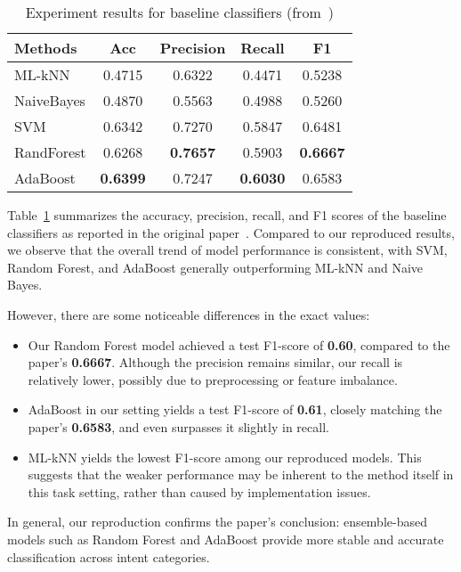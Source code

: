 \documentclass{article}
\begin{document}
\begin{table}[htbp]
\centering
\caption{Experiment results for baseline classifiers (from~\cite{qu2019user})}
\label{tab:baseline-results}
\begin{tabular}{lcccc}
\toprule
\textbf{Methods} & \textbf{Acc} & \textbf{Precision} & \textbf{Recall} & \textbf{F1} \\
\midrule
ML-kNN     & 0.4715 & 0.6322 & 0.4471 & 0.5238 \\
NaiveBayes & 0.4870 & 0.5563 & 0.4988 & 0.5260 \\
SVM        & 0.6342 & 0.7270 & 0.5847 & 0.6481 \\
RandForest & 0.6268 & \textbf{0.7657} & 0.5903 & \textbf{0.6667} \\
AdaBoost   & \textbf{0.6399} & 0.7247 & \textbf{0.6030} & 0.6583 \\
\bottomrule
\end{tabular}
\end{table}

Table~\ref{tab:baseline-results} summarizes the accuracy, precision, recall, and F1 scores of the baseline classifiers as reported in the original paper~\cite{qu2019user}. Compared to our reproduced results, we observe that the overall trend of model performance is consistent, with SVM, Random Forest, and AdaBoost generally outperforming ML-kNN and Naive Bayes.

However, there are some noticeable differences in the exact values:

\begin{itemize}
  \item Our Random Forest model achieved a test F1-score of \textbf{0.60}, compared to the paper’s \textbf{0.6667}. Although the precision remains similar, our recall is relatively lower, possibly due to preprocessing or feature imbalance.
  \item AdaBoost in our setting yields a test F1-score of \textbf{0.61}, closely matching the paper’s \textbf{0.6583}, and even surpasses it slightly in recall.
  \item ML-kNN yields the lowest F1-score among our reproduced models.
  This suggests that the weaker performance may be inherent to the method itself in this task setting, rather than caused by implementation issues.

\end{itemize}

In general, our reproduction confirms the paper’s conclusion: ensemble-based models such as Random Forest and AdaBoost provide more stable and accurate classification across intent categories.





\end{document}
